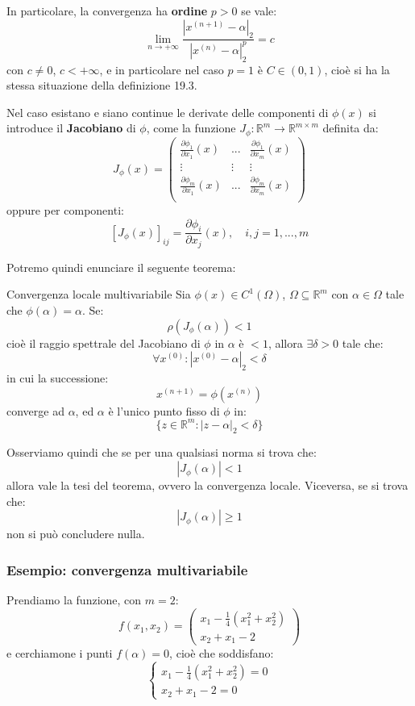 \documentclass[a4paper,11pt]{article}
\begin{document}
In particolare, la convergenza ha \textbf{ordine} $p > 0$ se vale:
$$
\lim_{n \rightarrow +\infty} \frac{|x^{(n + 1)} - \alpha|_2}{|x^{(n)} - \alpha|_2^p} = c 
$$
con $c \neq 0$, $c < +\infty$, e in particolare nel caso $p = 1$ è $C \in (0, 1)$, cioè si ha la stessa situazione della definizione 19.3.

\par\smallskip

Nel caso esistano e siano continue le derivate delle componenti di $\phi(x)$ si introduce il \textbf{Jacobiano} di $\phi$, come la funzione $J_\phi : \mathbb{R}^m \rightarrow \mathbb{R}^{m \times m}$ definita da:
$$
J_\phi(x) = 
\begin{pmatrix}
	\frac{\partial \phi_1}{\partial x_1}(x) & ... & \frac{\partial \phi_1}{\partial x_m}(x) \\
	\vdots & \vdots & \vdots \\
	\frac{\partial \phi_m}{\partial x_1}(x) & ... & \frac{\partial \phi_m}{\partial x_m}(x) \\
\end{pmatrix}
$$
oppure per componenti:
$$
[J_\phi(x)]_{ij} = \frac{\partial \phi_i}{\partial x_j} (x), \quad i, j = 1, ..., m
$$

Potremo quindi enunciare il seguente teorema:
\begin{theorem}{Convergenza locale multivariabile}
	Sia $\phi(x) \in C^1(\Omega)$, $\Omega \subseteq \mathbb{R}^m$ con $\alpha \in \Omega$ tale che $\phi(\alpha) = \alpha$.
	Se:
	$$
	\rho\left(J_\phi (\alpha) \right) < 1
	$$
	cioè il raggio spettrale del Jacobiano di $\phi$ in $\alpha$ è $< 1$, allora $\exists \delta > 0$ tale che:
	$$
	\forall x^{(0)} : |x^{(0)} - \alpha|_2 < \delta
	$$
	in cui la successione:
	$$
	x^{(n + 1)} = \phi(x^{(n)})
	$$
	converge ad $\alpha$, ed $\alpha$ è l'unico punto fisso di $\phi$ in:
	$$
	\{ z \in \mathbb{R}^m : |z - \alpha|_2 < \delta \}
	$$
\end{theorem}

Osserviamo quindi che se per una qualsiasi norma si trova che:
$$
| J_\phi(\alpha) | < 1
$$
allora vale la tesi del teorema, ovvero la convergenza locale.
Viceversa, se si trova che:
$$
| J_\phi(\alpha) | \geq 1
$$
non si può concludere nulla.

\subsubsection{Esempio: convergenza multivariabile}
Prendiamo la funzione, con $m = 2$:
$$
f(x_1, x_2) = 
\begin{pmatrix}
	x_1 - \frac{1}{4} (x_1^2 + x_2^2) \\
	x_2 + x_1 - 2
\end{pmatrix}
$$
e cerchiamone i punti $f(\alpha) = 0$, cioè che soddisfano:
\[
	\begin{cases}
		x_1 - \frac{1}{4} (x_1^2 + x_2^2) = 0 \\
		x_2 + x_1 - 2 = 0
	\end{cases}
\]
\end{document}

